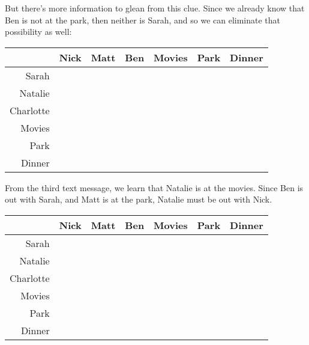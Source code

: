 But there's more information to glean from this clue.  Since we already know that Ben is not at the park, then neither is Sarah, and so we can eliminate that possibility as well:

\begin{tcolorbox}[width=\textwidth,colback=black!10]
    \begin{center}
        \begin{tabular}{r|c|c|c||c|c|c|}
            & Nick & Matt & Ben & Movies & Park & Dinner\\
            \hline\hline
            Sarah & \mX{} & \mX{} & \mO{} & & \mX{} & \\
            \hline
            Natalie & & & \mX{} & & &\\
            \hline
            Charlotte & & & \mX{} & & & \\
            \hline\hline
            Movies & & \mX{} & \\
            \cline{1-4}
            Park & \mX{} & \mO{} & \mX{} \\
            \cline{1-4}
            Dinner & & \mX{} &\\
            \cline{1-4}
        \end{tabular}
    \end{center}
\end{tcolorbox}

From the third text message, we learn that Natalie is at the movies.  Since Ben is out with Sarah, and Matt is at the park, Natalie must be out with Nick.

\begin{tcolorbox}[width=\textwidth,colback=black!10]
    \begin{center}
        \begin{tabular}{r|c|c|c||c|c|c|}
            & Nick & Matt & Ben & Movies & Park & Dinner\\
            \hline\hline
            Sarah & \mX{} & \mX{} & \mO{} & & \mX{} & \\
            \hline
            Natalie & \mO{} & \mX{} & \mX{} & \mO{} & \mX{} & \mX{} \\
            \hline
            Charlotte & \mX{} & & \mX{} & & & \\
            \hline\hline
            Movies & \mO{} & \mX{} & \\
            \cline{1-4}
            Park & \mX{} & \mO{} & \mX{} \\
            \cline{1-4}
            Dinner & & \mX{} &\\
            \cline{1-4}
        \end{tabular}
    \end{center}
\end{tcolorbox}

